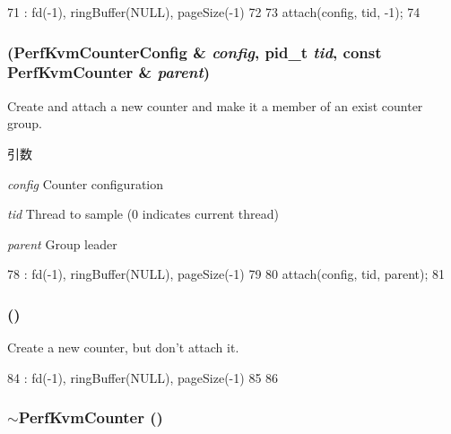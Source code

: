 \begin{DoxyCode}
71     : fd(-1), ringBuffer(NULL), pageSize(-1)
72 {
73     attach(config, tid, -1);
74 }
\end{DoxyCode}
\hypertarget{classPerfKvmCounter_a6e10b934e1d000c59742d748b42824bd}{
\subsubsection[{PerfKvmCounter}]{ ({\bf PerfKvmCounterConfig} \& {\em config}, \/  pid\_\-t {\em tid}, \/  const {\bf PerfKvmCounter} \& {\em parent})}}
\label{classPerfKvmCounter_a6e10b934e1d000c59742d748b42824bd}
Create and attach a new counter and make it a member of an exist counter group.


\begin{DoxyParams}{引数}
\item[{\em config}]Counter configuration \item[{\em tid}]Thread to sample (0 indicates current thread) \item[{\em parent}]Group leader \end{DoxyParams}



\begin{DoxyCode}
78     : fd(-1), ringBuffer(NULL), pageSize(-1)
79 {
80     attach(config, tid, parent);
81 }
\end{DoxyCode}
\hypertarget{classPerfKvmCounter_a48fc3925e8430dcead140f4c27a1e4ce}{
\subsubsection[{PerfKvmCounter}]{ ()}}
\label{classPerfKvmCounter_a48fc3925e8430dcead140f4c27a1e4ce}
Create a new counter, but don't attach it. 


\begin{DoxyCode}
84     : fd(-1), ringBuffer(NULL), pageSize(-1)
85 {
86 }
\end{DoxyCode}
\hypertarget{classPerfKvmCounter_afadd01640b4cbc3b749f702d60e7a04b}{
\subsubsection[{$\sim$PerfKvmCounter}]{\setlength{\rightskip}{0pt plus 5cm}$\sim${\bf PerfKvmCounter} ()}}
\label{classPerfKvmCounter_afadd01640b4cbc3b749f702d60e7a04b}



